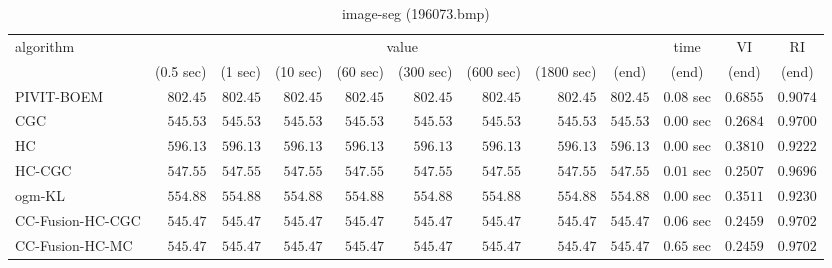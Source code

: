 \begin{table}[H]
\scriptsize
\centering
\caption{image-seg (196073.bmp)}
\label{tab:anytimetable-image-seg-196073.bmp}
\begin{tabular}{lrrrrrrrrrrr}
\toprule
           algorithm &                                   \multicolumn{8}{c}{value} & \multicolumn{1}{c}{time}    & \multicolumn{1}{c}{VI}  & \multicolumn{1}{c}{RI} \\  
\cmidrule(lr){2-9}\cmidrule(lr){10-10} \cmidrule(lr){11-11} \cmidrule(lr){12-12}   
                     & \multicolumn{1}{c}{(0.5 sec)} & \multicolumn{1}{c}{(1 sec)} & \multicolumn{1}{c}{(10 sec)} & \multicolumn{1}{c}{(60 sec)} & \multicolumn{1}{c}{(300 sec)} & \multicolumn{1}{c}{(600 sec)} & \multicolumn{1}{c}{(1800 sec)} & \multicolumn{1}{c}{(end)} & \multicolumn{1}{c}{(end)}    & \multicolumn{1}{c}{(end)}   & \multicolumn{1}{c}{(end)}  \\ \midrule 
          PIVIT-BOEM & $       802.45$ & $       802.45$ & $       802.45$ & $       802.45$ & $       802.45$ & $       802.45$ & $       802.45$ & $       802.45$ & $         0.08$ sec    & $       0.6855$  & $       0.9074$ \\ 
                 CGC & $       545.53$ & $       545.53$ & $       545.53$ & $       545.53$ & $       545.53$ & $       545.53$ & $       545.53$ & $       545.53$ & $         0.00$ sec    & $       0.2684$  & $       0.9700$ \\ 
                  HC & $       596.13$ & $       596.13$ & $       596.13$ & $       596.13$ & $       596.13$ & $       596.13$ & $       596.13$ & $       596.13$ & $         0.00$ sec    & $       0.3810$  & $       0.9222$ \\ 
              HC-CGC & $       547.55$ & $       547.55$ & $       547.55$ & $       547.55$ & $       547.55$ & $       547.55$ & $       547.55$ & $       547.55$ & $         0.01$ sec    & $       0.2507$  & $       0.9696$ \\ 
              ogm-KL & $       554.88$ & $       554.88$ & $       554.88$ & $       554.88$ & $       554.88$ & $       554.88$ & $       554.88$ & $       554.88$ & $         0.00$ sec    & $       0.3511$  & $       0.9230$ \\ 
    CC-Fusion-HC-CGC & $       545.47$ & $       545.47$ & $       545.47$ & $       545.47$ & $       545.47$ & $       545.47$ & $       545.47$ & $       545.47$ & $         0.06$ sec    & $       0.2459$  & $       0.9702$ \\ 
     CC-Fusion-HC-MC & $       545.47$ & $       545.47$ & $       545.47$ & $       545.47$ & $       545.47$ & $       545.47$ & $       545.47$ & $       545.47$ & $         0.65$ sec    & $       0.2459$  & $       0.9702$ \\ 

\end{tabular}
\end{table}
